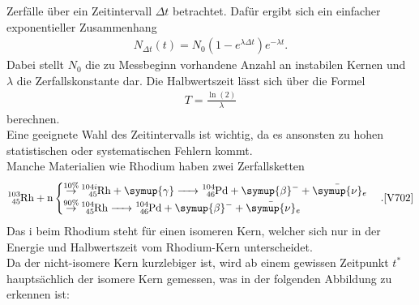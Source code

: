 Zerfälle über ein Zeitintervall $\Delta t$ betrachtet. Dafür ergibt sich ein
einfacher exponentieller Zusammenhang \cite{V702}
\begin{align}
    N_{\Delta t} (t) = N_0 (1-e^{\lambda \Delta t}) e^{- \lambda t}. \label{eq:5} 
\end{align}
Dabei stellt $N_0$ die zu Messbeginn vorhandene Anzahl an instabilen Kernen und $\lambda$ die Zerfallskonstante dar.
Die Halbwertszeit lässt sich über die Formel \cite{V702}
\begin{align}
    T=\frac{\ln(2)}{\lambda} \label{eq:6}
\end{align}
berechnen.\\
Eine geeignete Wahl des Zeitintervalls ist wichtig, da es ansonsten zu hohen
statistischen oder systematischen Fehlern kommt.\\
Manche Materialien wie Rhodium haben zwei Zerfallsketten\\
\begin{align}
\ce{^{103}_{45}Rh + n}  
\begin{cases}
    \ce{\stackrel{10\%}{\to} ^{104i}_{45}Rh +\symup{\gamma} -> ^{104}_{46}Pd +\symup{\beta}^- + \bar{\symup{\nu}}_e }\\
    \ce{\stackrel{90\%}{\to} ^{104}_{45}Rh ->  ^{104}_{46}Pd +\symup{\beta}^- + \bar{\symup{\nu}}_e }
\end{cases}.\text{\cite{V702}} \label{eq:7}
\end{align}
Das i beim Rhodium steht für einen isomeren Kern, welcher sich nur in der Energie und
Halbwertszeit vom Rhodium-Kern unterscheidet.\\
Da der nicht-isomere Kern kurzlebiger ist, wird ab einem gewissen Zeitpunkt $t^*$ hauptsächlich
der isomere Kern gemessen, was in der folgenden Abbildung zu erkennen ist:
